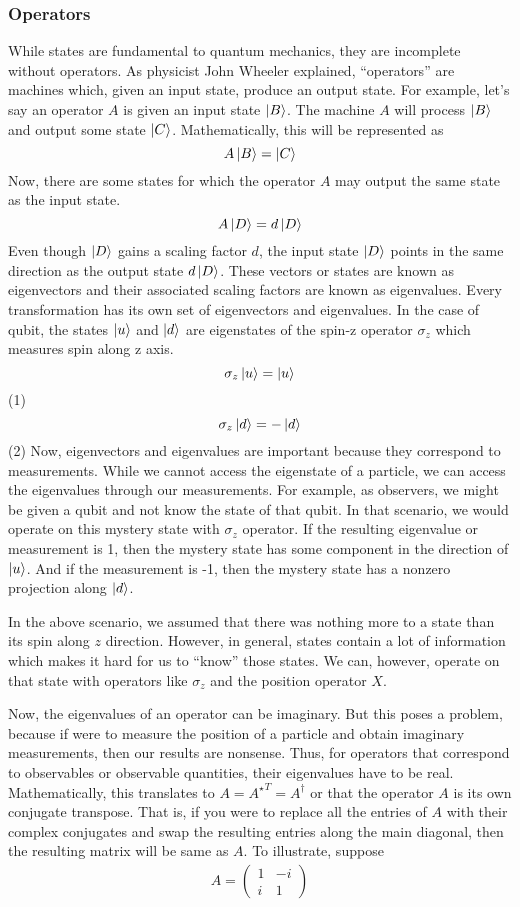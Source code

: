 \documentclass{article}
\begin{document}
\subsubsection{Operators}
  While states are fundamental to quantum mechanics, they are incomplete without
  operators. As physicist John Wheeler explained, ``operators'' are machines
  which, given an input state, produce an output state. For example, let's say
  an operator \(A\) is given an input state \(\ket{B}\). The machine \(A\) will
  process \(\ket{B}\) and output some state \(\ket{C}\). Mathematically, this
  will be represented as
  \[A\ket{B} = \ket{C}\]
  Now, there are some states for which the operator \(A\) may output the same
  state as the input state.
  \[A\ket{D} = d\ket{D}\]
  Even though \(\ket{D}\) gains a scaling factor \(d\), the input state \(\ket{D}\)
  points in the same direction as the output state \(d\ket{D}\). These vectors or
  states are known as eigenvectors and their associated scaling factors are known
  as eigenvalues. Every transformation has its own set of eigenvectors and
  eigenvalues. In the case of qubit, the states \(\ket{u}\) and \(\ket{d}\) are eigenstates
  of the spin-z operator \(\sigma_z\) which measures spin along z axis.
  \[\sigma_z\ket{u} = \ket{u}\]    (1)
  \[\sigma_z\ket{d} = -\ket{d}\] (2)
  Now, eigenvectors and eigenvalues are important because they correspond to
  measurements. While we cannot access the eigenstate of a particle, we can
  access the eigenvalues through our measurements. For example, as observers,
  we might be given a qubit and not know the state of that qubit. In that
  scenario, we would operate on this mystery state with \(\sigma_z\) operator.
  If the resulting eigenvalue or measurement is 1, then the mystery state
  has some component in the direction of \(\ket{u}\). And if the measurement is -1,
  then the mystery state has a nonzero projection along \(\ket{d}\).

  In the above scenario, we assumed that there was nothing more to a state than
  its spin along \(z\) direction. However, in general, states contain a lot of
  information which makes it hard for us to ``know'' those states. We can, however,
  operate on that state with operators like \(\sigma_z\) and the position operator
  \(X\).

  Now, the eigenvalues of an operator can be imaginary.  But this poses a problem,
  because if were to measure the position of a particle and obtain imaginary
  measurements, then our results are nonsense. Thus, for operators that correspond
  to observables or observable quantities,
  their eigenvalues have to be real. Mathematically,
  this translates to
  \(A = {A^{\star}}^{T} = A^{\dagger}\)
  or that the operator \(A\) is its own conjugate transpose. That is, if you were
  to replace all the entries of \(A\) with their complex conjugates and swap the
  resulting entries along the main diagonal, then the resulting matrix will be
  same as \(A\). To illustrate, suppose
  \begin{gather}
    A
    =
    \begin{pmatrix}
      1 & -i \\
      i &  1
    \end{pmatrix}
  \end{gather}
\end{document}

